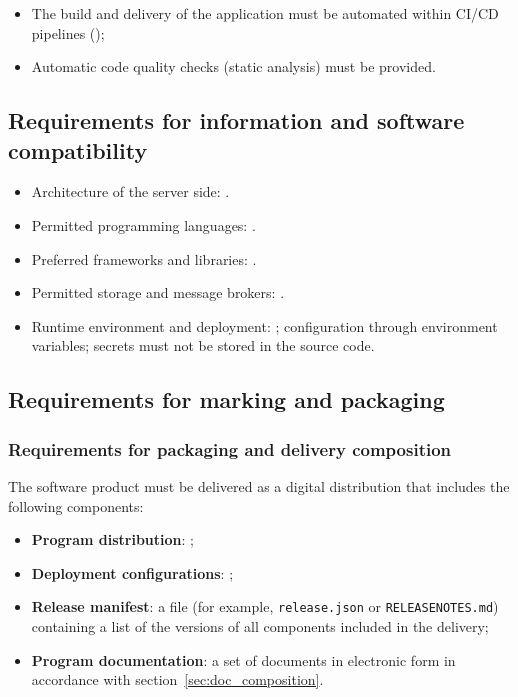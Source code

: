 \documentclass[12pt,a4paper]{extarticle}
\begin{document}
\begin{itemize}[leftmargin=1.25cm]
\item The build and delivery of the application must be automated within CI/CD pipelines ();
\item Automatic code quality checks (static analysis) must be provided.
\end{itemize}

\subsection{Requirements for information and software compatibility}

\begin{itemize}[leftmargin=1.25cm]
\item Architecture of the server side: .
\item Permitted programming languages: .
\item Preferred frameworks and libraries: .
\item Permitted storage and message brokers: .
\item Runtime environment and deployment: ; configuration through environment variables; secrets must not be stored in the source code.
\end{itemize}

\subsection{Requirements for marking and packaging}

\subsubsection{Requirements for packaging and delivery composition}

\begin{hseExample}
The software product must be delivered as a digital distribution that includes the following components:
\begin{itemize}[nosep, leftmargin=1.25cm]
    \item \textbf{Program distribution}: ;
    \item \textbf{Deployment configurations}: ;
    \item \textbf{Release manifest}: a file (for example, \texttt{release.json} or \texttt{RELEASENOTES.md}) containing a list of the versions of all components included in the delivery;
    \item \textbf{Program documentation}: a set of documents in electronic form in accordance with section~\ref{sec:doc_composition}.
\end{itemize}
\end{hseExample}
\end{document}
